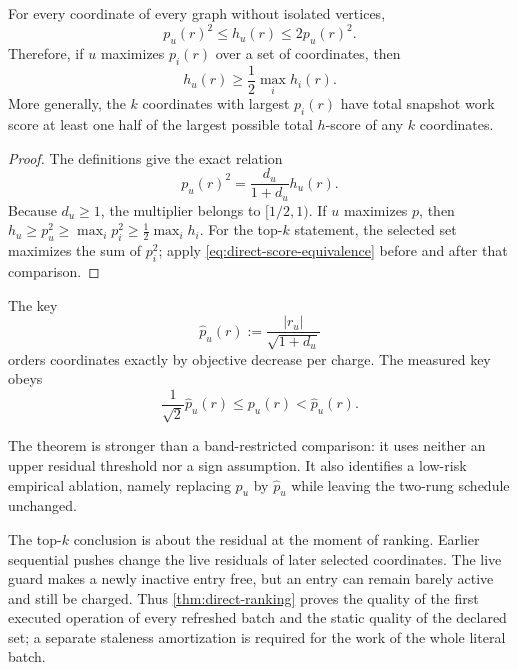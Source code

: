 \begin{theorem}
\label{thm:direct-ranking}
For every coordinate of every graph without isolated vertices,
\begin{equation}
 p_u(r)^2\leq h_u(r)\leq2p_u(r)^2.
 \label{eq:direct-score-equivalence}
\end{equation}
Therefore, if $u$ maximizes $p_i(r)$ over a set of coordinates, then
\begin{equation}
 h_u(r)\geq\frac12\max_i h_i(r).
 \label{eq:direct-rank-two-approx}
\end{equation}
More generally, the $k$ coordinates with largest $p_i(r)$ have total
snapshot work score at least one half of the largest possible total
$h$-score of any $k$ coordinates.
\end{theorem}

\begin{proof}
The definitions give the exact relation
\begin{equation*}
 p_u(r)^2
 =\frac{d_u}{1+d_u}h_u(r).
\end{equation*}
Because $d_u\geq1$, the multiplier belongs to $[1/2,1)$. If $u$ maximizes
$p$, then
$h_u\geq p_u^2\geq\max_i p_i^2\geq\frac12\max_i h_i$.
For the top-$k$ statement, the selected set maximizes the sum of $p_i^2$;
apply \cref{eq:direct-score-equivalence} before and after that comparison.
\end{proof}

\begin{corollary}
\label{cor:direct-exact-score}
The key
\begin{equation}
 \widehat p_u(r):=\frac{|r_u|}{\sqrt{1+d_u}}
 \label{eq:direct-alternative-score}
\end{equation}
orders coordinates exactly by objective decrease per charge. The measured
key obeys
\begin{equation}
 \frac1{\sqrt2}\widehat p_u(r)
 \leq p_u(r)<\widehat p_u(r).
 \label{eq:direct-key-comparison}
\end{equation}
\end{corollary}

The theorem is stronger than a band-restricted comparison: it uses neither
an upper residual threshold nor a sign assumption. It also identifies a
low-risk empirical ablation, namely replacing $p_u$ by $\widehat p_u$ while
leaving the two-rung schedule unchanged.

\begin{remark}
\label{rem:direct-staleness}
The top-$k$ conclusion is about the residual at the moment of ranking.
Earlier sequential pushes change the live residuals of later selected
coordinates. The live guard makes a newly inactive entry free, but an entry
can remain barely active and still be charged. Thus
\cref{thm:direct-ranking} proves the quality of the first executed operation
of every refreshed batch and the static quality of the declared set; a
separate staleness amortization is required for the work of the whole literal
batch.
\end{remark}
